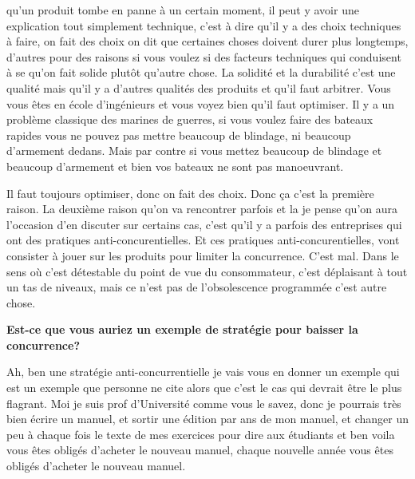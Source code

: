 \begin{small}
qu'un produit tombe en panne à un certain moment, il peut y avoir une explication tout simplement technique, c'est à dire qu'il y a des choix techniques à faire, on fait des choix on dit que certaines choses doivent durer plus longtemps, d'autres pour des raisons si vous voulez si des facteurs techniques qui conduisent à se qu'on fait solide plutôt qu'autre chose. La solidité et la durabilité c'est une qualité mais qu'il y a d'autres qualités des produits et qu'il faut arbitrer. Vous vous êtes en école d'ingénieurs et vous voyez bien qu'il faut optimiser. Il y a un problème classique des marines de guerres, si vous voulez faire des bateaux rapides vous ne pouvez pas mettre beaucoup de blindage, ni beaucoup d'armement dedans. Mais par contre si vous mettez beaucoup de blindage et beaucoup d'armement et bien vos bateaux ne sont pas manoeuvrant.

 Il faut toujours optimiser, donc on fait des choix. Donc ça c'est la première raison. La deuxième raison qu'on va rencontrer parfois et la je pense qu'on aura l'occasion d'en discuter sur certains cas, c'est qu'il y a parfois des entreprises qui ont des pratiques anti-concurentielles. Et ces pratiques anti-concurentielles, vont consister à jouer sur les produits pour limiter la concurrence. C'est mal. Dans le sens où c'est détestable du point de vue du consommateur, c'est déplaisant à tout un tas de niveaux, mais ce n'est pas de l'obsolescence programmée c'est autre chose.

\smallbreak\textbf{Est-ce que vous auriez un exemple de stratégie pour baisser la concurrence?
}\smallbreak

Ah, ben une stratégie anti-concurrentielle je vais vous en donner un exemple qui est un exemple que personne ne cite alors que c'est le cas qui devrait être le plus flagrant. Moi je suis prof d'Université comme vous le savez, donc je pourrais très bien écrire un manuel, et sortir une édition par ans de mon manuel, et changer un peu à chaque fois le texte de mes exercices pour dire aux étudiants et ben voila vous êtes obligés d'acheter le nouveau manuel, chaque nouvelle année vous êtes obligés d'acheter le nouveau manuel.



\end{small}
